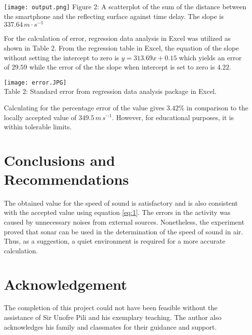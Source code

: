 \documentclass{article}
\begin{document}
\begin{multicols}{2}
\begin{center}
\texttt{[image: output.png]}
Figure 2: A scatterplot of the sum of the distance between the smartphone and the reflecting surface against time delay. The slope is $337.64 \, m \cdot s^{-1} $
\end{center}

For the calculation of error, regression data analysis in Excel was utilized as shown in Table 2. From the regression table in Excel, the equation of the slope without setting the intercept to zero is $y=313.69x+0.15$ which yields an error of $29.59$ while the error of the the slope when intercept is set to zero is $4.22$. 

\begin{center}
\texttt{[image: error.JPG]}\\
Table 2: Standard error from regression data analysis package in Excel.
\end{center}

Calculating for the percentage error of the value gives $3.42\%$ in comparison to the locally accepted value of $349.5 \, m \, s^{-1}$. However, for educational purposes, it is within tolerable limits.

\section{Conclusions and \\ Recommendations}
\paragraph{}

The obtained value for the speed of sound is satisfactory and is also consistent with the accepted value using equation \eqref{eq:1}. The errors in the activity was caused by unnecessary noises from external sources. Nonetheless, the experiment proved that sonar can be used in the determination of the speed of sound in air. Thus, as a suggestion, a quiet environment is required for a more accurate calculation.

\section*{Acknowledgement}
\paragraph{}

The completion of this project could not have been feasible without the assistance of Sir Unofre Pili and his exemplary teaching. The author also acknowledges his family and classmates for their guidance and support.



\end{multicols}
\end{document}

